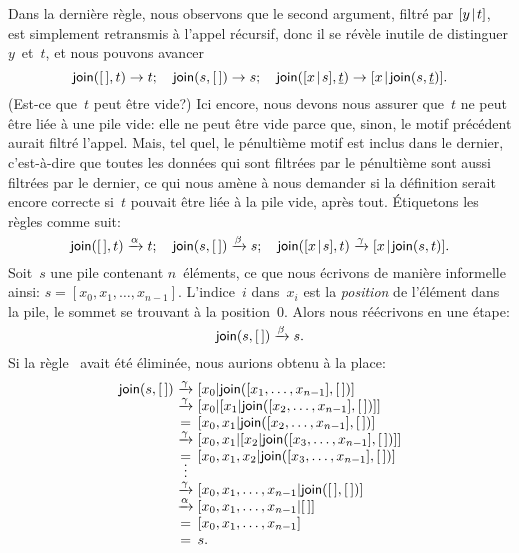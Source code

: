 Dans la dernière règle, nous observons que le second argument, filtré
par \([{y}\!\mid\!{t}]\), est simplement retransmis à l'appel récursif,
donc il se révèle inutile de distinguer \(y\)~et~\(t\), et nous
pouvons avancer
\begin{equation*}
\textsf{join}([\,],t) \rightarrow t;\quad
\textsf{join}(s,[\,]) \rightarrow s;\quad
\textsf{join}([{x}\!\mid\!{s}],\underline{t}) \rightarrow
[{x}\!\mid\!{\textsf{join}(s,\underline{t})}].
\end{equation*}
(Est-ce que~\(t\) peut être vide?) Ici encore, nous devons nous
assurer que~\(t\) ne peut être liée à une pile vide: elle ne peut être
vide parce que, sinon, le motif précédent aurait filtré l'appel. Mais,
tel quel, le pénultième motif est inclus dans le dernier, c'est-à-dire
que toutes les données qui sont filtrées par le pénultième sont aussi
filtrées par le dernier, ce qui nous amène à nous demander si la
définition serait encore correcte si~\(t\) pouvait être liée à la pile
vide, après tout. Étiquetons les règles comme suit:
\begin{equation*}
\textsf{join}([\,],t) \xrightarrow{\smash{\alpha}} t;\quad
\textsf{join}(s,[\,]) \xrightarrow{\smash{\beta}} s;\quad
\textsf{join}([{x}\!\mid\!{s}],t) \xrightarrow{\smash{\gamma}}
[{x}\!\mid\!{\textsf{join}(s,t)}].
\end{equation*}
Soit~\(s\) une pile contenant \(n\)~éléments, ce que nous écrivons de
manière informelle ainsi: \(s = [x_0, x_1, \dots,
x_{n-1}]\). L'indice~\(i\) dans~\(x_i\) est la \emph{position} de
l'élément dans la pile, le sommet se trouvant à la
position~\(0\). Alors nous réécrivons en une étape:
\begin{equation*}
\textsf{join}(s,[\,]) \xrightarrow{\smash{\beta}} s.
\end{equation*}
Si la règle~\clause{\beta} avait été éliminée, nous aurions obtenu à
la place:
\begin{equation*}
\begin{array}{r@{\;}c@{\;}l}
\fun{join}(s,\el) 
& \smashedrightarrow{\gamma} &
  [x\sb{0}|\fun{join}([x\sb{1},\ldots,x\sb{n-1}],\el)]\\
& \smashedrightarrow{\gamma} & 
  [x\sb{0}|[x\sb{1}|\fun{join}([x\sb{2},\ldots,x\sb{n-1}],\el)]]\\
& = & [x\sb{0},x\sb{1}|\fun{join}([x\sb{2},\ldots,x\sb{n-1}],\el)]\\
& \smashedrightarrow{\gamma} &
  [x\sb{0},x\sb{1}|[x\sb{2}|\fun{join}([x\sb{3},\ldots,x\sb{n-1}],\el)]]\\
& = & [x\sb{0},x\sb{1},x\sb{2}|\fun{join}([x\sb{3},\ldots,x\sb{n-1}],\el)]\\
& \smash{\vdots} &\\
& \smashedrightarrow{\gamma} & 
  [x\sb{0},x\sb{1},\ldots,x\sb{n-1}|\fun{join}(\el,\el)]\\
& \smashedrightarrow{\alpha} & [x\sb{0},x\sb{1},\ldots,x\sb{n-1}|\el]\\
& = & [x\sb{0},x\sb{1},\ldots,x\sb{n-1}]\\
& = & s.
\end{array}
\end{equation*}
